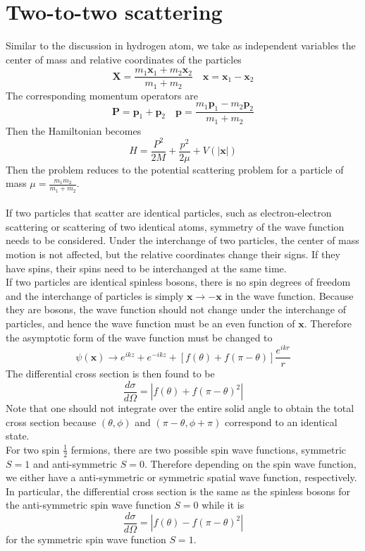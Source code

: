 \documentclass[cyan]{elegantnote}
\begin{document}
\section{Two-to-two scattering}
Similar to the discussion in hydrogen atom, we take as independent variables the center of mass and relative coordinates of the particles
\[\bm{X} = \frac{m_1\bm{x}_1 + m_2\bm{x}_2}{m_1+m_2} \quad \bm{x} = \bm{x}_1-\bm{x}_2\]
The corresponding momentum operators are
\[\bm{P} = \bm{p}_1 + \bm{p}_2 \quad \bm{p} = \frac{m_1\bm{p}_1-m_2\bm{p}_2}{m_1 + m_2}\]
Then the Hamiltonian becomes
\[H = \frac{P^2}{2M} + \frac{p^2}{2\mu} + V(|\bm{x}|)\]
Then the problem reduces to the potential scattering problem for a particle of mass $\mu = \frac{m_1m_2}{m_1+m_2}$.
\\ \\
If two particles that scatter are identical particles, such as electron-electron scattering or scattering of two identical atoms, symmetry of the wave function needs to be considered.
Under the interchange of two particles, the center of mass motion is not affected, but the relative coordinates change their signs. If they have spins, their spins need to be interchanged at the same time.
\\
If two particles are identical spinless bosons, there is no spin degrees of freedom and the interchange of particles is simply $\bm{x} \to -\bm{x}$ in the wave function. 
Because they are bosons, the wave function should not change under the interchange of particles, and hence the wave function must be an even function of $\bm{x}$. 
Therefore the asymptotic form of the wave function must be changed to
\[\psi(\bm{x}) \to e^{ikz} + e^{-ikz} + [f(\theta) + f(\pi - \theta)] \frac{e^{ikr}}{r}\]
The differential cross section is then found to be
\[\frac{d\sigma}{d\Omega} = |f(\theta)+f(\pi-\theta)^2|\]
Note that one should not integrate over the entire solid angle to obtain the total cross section because $(\theta,\phi)$ and $(\pi - \theta,\phi+\pi)$ correspond to an identical state.
\\
For two spin $\frac{1}{2}$ fermions, there are two possible spin wave functions, symmetric $S = 1$ and anti-symmetric $S = 0$.
Therefore depending on the spin wave function, we either have a anti-symmetric or symmetric spatial wave function, respectively. In particular, the differential cross section is the same as the spinless bosons for the anti-symmetric spin wave function $S= 0 $ while it is
\[\frac{d\sigma}{d\Omega} = |f(\theta) - f(\pi-\theta)^2|\]
for the symmetric spin wave function $S = 1$.
\end{document}

